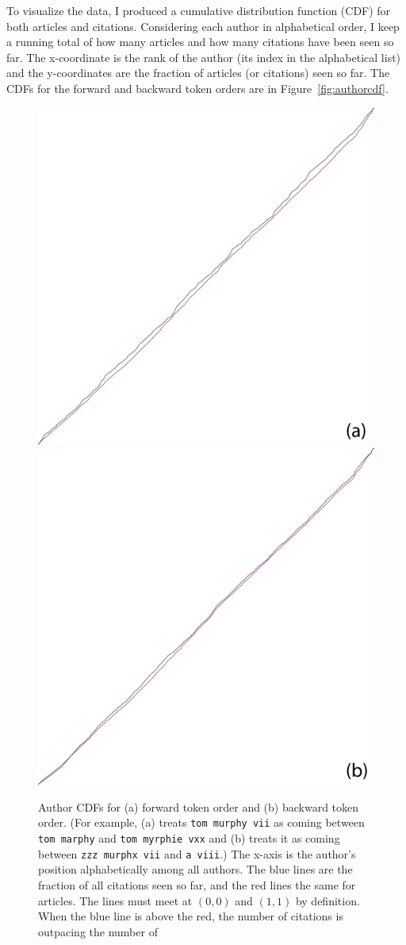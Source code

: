 \documentclass[twocolumn]{article}
\begin{document}
To visualize the data, I produced a cumulative distribution function
(CDF) for both articles and citations. Considering each author in
alphabetical order, I keep a running total of how many articles and
how many citations have been seen so far. The x-coordinate is the rank
of the author (its index in the alphabetical list) and the
y-coordinates are the fraction of articles (or citations) seen so far.
The CDFs for the forward and backward token orders are in
Figure~\ref{fig:authorcdf}.

\begin{figure}[t]
  \begin{center}
  \includegraphics[width=0.44 \textwidth]{authorstats-forward}
  \includegraphics[width=0.44 \textwidth]{authorstats-backward}
  \end{center}
  \caption{ Author CDFs for (a) forward token order and (b) backward
    token order. (For example, (a) treats {\tt tom murphy vii} as
    coming between {\tt tom marphy} and {\tt tom myrphie vxx} and (b)
    treats it as coming between {\tt zzz murphx vii} and {\tt a
      viii}.) The x-axis is the author's position alphabetically among
    all authors. The blue lines are the fraction of all citations seen
    so far, and the red lines the same for articles. The lines must
    meet at $(0,0)$ and $(1,1)$ by definition. When the blue line is
    above the red, the number of citations is outpacing the number of
}
\end{figure}
\end{document}
